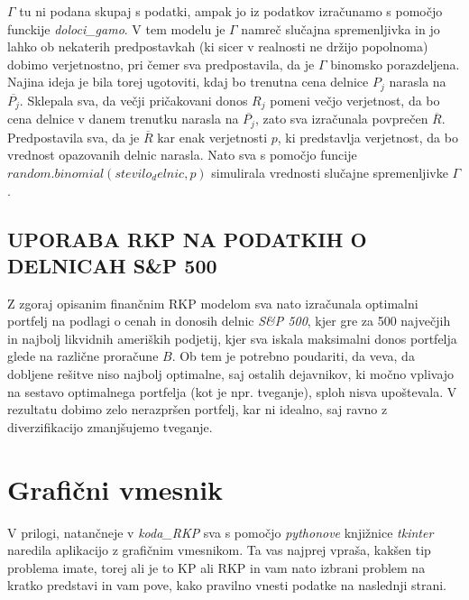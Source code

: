 \documentclass[a4paper,12pt]{article}
\theoremstyle{definition}
\begin{document}
$\Gamma$ tu ni podana skupaj s podatki, ampak jo iz podatkov izračunamo s pomočjo funckije \textit{doloci\_gamo}.
V tem modelu je $\Gamma$ namreč slučajna spremenljivka in jo lahko ob nekaterih predpostavkah (ki 
sicer v realnosti ne držijo popolnoma) dobimo verjetnostno, pri čemer sva predpostavila, da je $\Gamma$
binomsko porazdeljena. Najina ideja je bila torej ugotoviti, kdaj bo trenutna cena delnice $P_j$ narasla na 
$\overline{P_j}$. Sklepala sva, da večji pričakovani donos $R_j$ pomeni večjo verjetnost, da
bo cena delnice v danem trenutku narasla na $\overline{P_j}$, zato sva izračunala povprečen $\overline{R}$. 
Predpostavila sva, da je $\overline{R}$ kar enak verjetnosti $p$, ki predstavlja verjetnost,
da bo vrednost opazovanih delnic narasla. Nato sva s pomočjo funcije $random.binomial(stevilo_delnic, p)$ 
simulirala vrednosti slučajne spremenljivke $\Gamma$.

\subsection{UPORABA RKP NA PODATKIH O DELNICAH S\&P 500}
Z zgoraj opisanim finančnim RKP modelom sva nato izračunala optimalni portfelj na podlagi 
o cenah in donosih delnic \textit{S\&P 500}, kjer gre za 500 največjih in najbolj likvidnih
ameriških podjetij, kjer sva iskala maksimalni donos portfelja glede na različne proračune $B$.
Ob tem je potrebno poudariti, da veva, da dobljene rešitve niso najbolj optimalne, saj
ostalih dejavnikov, ki močno vplivajo na sestavo optimalnega portfelja (kot je npr. tveganje), 
sploh nisva upoštevala. V rezultatu dobimo zelo nerazpršen portfelj,
kar ni idealno, saj ravno z diverzifikacijo zmanjšujemo tveganje. 




\section{Grafični vmesnik}

V prilogi, natančneje v \textit{koda\_RKP} sva s pomočjo \textit{pythonove} knjižnice \textit{tkinter}
naredila aplikacijo z grafičnim vmesnikom. Ta vas najprej vpraša, kakšen tip problema imate, torej ali 
je to KP ali RKP in vam nato izbrani problem na kratko predstavi in vam pove, kako pravilno vnesti podatke 
na naslednji strani.
\end{document}
